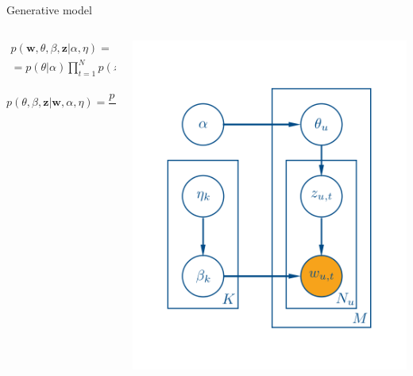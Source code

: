 \documentclass[aspectratio=1610]{beamer}
\begin{document}
\begin{frame}{Generative model}

\begin{columns}[C]
    \begin{column}{.5\textwidth} 
    \begin{multline*}    
     p(\mathbf{w}, \theta,\beta, \mathbf{z} | \alpha, \eta) = \\
    = p(\theta | \alpha) \prod_{t=1}^N p(z_t | \theta) p(\beta | \eta) p(w_t | z_t, \beta)
    \end{multline*}
    
    \vspace{2em}
    \[
    p(\theta, \beta, \mathbf{z} | \mathbf{w}, \alpha, \eta) = \frac{p(\theta,\beta, \mathbf{z}, \mathbf{w} | \alpha, \eta)}{p(\mathbf{w} | \alpha, \eta)}
    \]
    \end{column}
    \begin{column}{.5\textwidth} 
    \vspace{0em}
    \includegraphics[scale=0.25]{images/gm.png}   
    \end{column}
\end{columns}

\end{frame}
\end{document}
